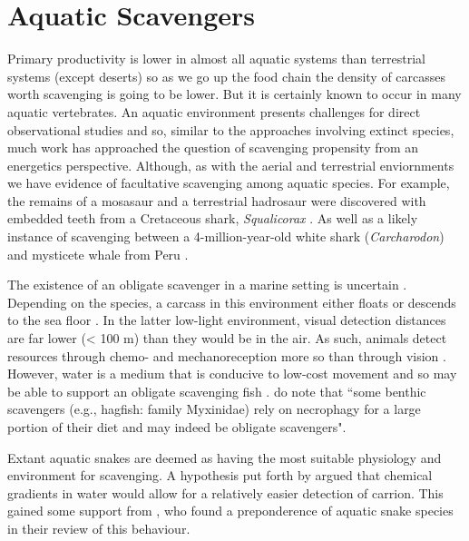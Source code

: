 \documentclass[a4paper,12pt]{article}
\begin{document}
\section*{Aquatic Scavengers} 
Primary productivity is lower in almost all aquatic systems than terrestrial systems (except deserts) so as we go up the food chain the density of carcasses worth scavenging is going to be lower.
But it is certainly known to occur in many aquatic vertebrates.
An aquatic environment presents challenges for direct observational studies and so, similar to the approaches involving extinct species, much work has approached the question of scavenging propensity from an energetics perspective.
Although, as with the aerial and terrestrial enviornments we have evidence of facultative scavenging among aquatic species.
For example, the remains of a mosasaur and a terrestrial hadrosaur were discovered with embedded teeth from a Cretaceous shark, \textit{Squalicorax} \citep{schwimmer1997scavenging}.
As well as a likely instance of scavenging between a 4-million-year-old white shark (\textit{Carcharodon}) and mysticete whale from Peru \citep{ehret2009caught}.
 
The existence of an obligate scavenger in a marine setting is uncertain \citep{britton1994marine,smith2003ecology,ruxton2004energetic,ruxton2005searching}.
Depending on the species, a carcass in this environment either floats or descends to the sea floor \citep{Whitehead415}.
In the latter low-light environment, visual detection distances are far lower (< 100 m) than they would be in the air.
As such, animals detect resources through chemo- and mechanoreception more so than through vision \citep{ruxton2004energetic}.
However, water is a medium that is conducive to low-cost movement \citep{tucker1975energetic} and so may be able to support an obligate scavenging fish \citep{ruxton2004energetic,ruxton2005searching}.
\cite{beasley2015vertebrates} do note that ``some benthic scavengers (e.g., hagfish: family Myxinidae) rely on necrophagy for a large portion of their diet and may indeed be obligate scavengers".


Extant aquatic snakes are deemed as having the most suitable physiology and environment for scavenging.
A hypothesis put forth by \cite{sazima1990necrofagia} argued that chemical gradients in water would allow for a relatively easier detection of carrion.
This gained some support from \cite{devault2002scavenging}, who found a preponderence of aquatic snake species in their review of this behaviour.
\end{document}
